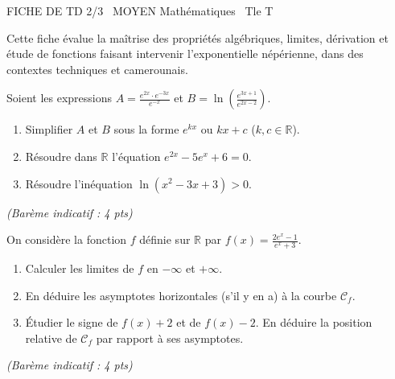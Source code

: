 \documentclass[11pt]{article}
\begin{document}
\begin{tcolorbox}[enhanced,colback=popink,colframe=popink,arc=10pt,boxrule=0pt,left=12pt,right=12pt,top=9pt,bottom=9pt]
{\color{white}\popxbold\small FICHE DE TD 2/3 \textbullet\ MOYEN \hfill Mathématiques \textbullet\ Tle T\par}
\end{tcolorbox}
\vspace{4pt}
\noindent Cette fiche évalue la maîtrise des propriétés algébriques, limites, dérivation et étude de fonctions faisant intervenir l'exponentielle népérienne, dans des contextes techniques et camerounais.

\begin{exercice}
Soient les expressions $A = \frac{e^{2x} \cdot e^{-3x}}{e^{-x}}$ et $B = \ln\left(\frac{e^{3x+1}}{e^{2x-2}}\right)$.
\begin{enumerate}
    \item Simplifier $A$ et $B$ sous la forme $e^{kx}$ ou $kx + c$ ($k, c \in \mathbb{R}$).
    \item Résoudre dans $\mathbb{R}$ l'équation $e^{2x} - 5e^{x} + 6 = 0$.
    \item Résoudre l'inéquation $\ln(x^2 - 3x + 3) > 0$.
\end{enumerate}
\hfill \textit{(Barème indicatif : 4 pts)}
\end{exercice}

\begin{exercice}
On considère la fonction $f$ définie sur $\mathbb{R}$ par $f(x) = \frac{2e^{x} - 1}{e^{x} + 3}$.
\begin{enumerate}
    \item Calculer les limites de $f$ en $-\infty$ et $+\infty$.
    \item En déduire les asymptotes horizontales (s'il y en a) à la courbe $\mathcal{C}_f$.
    \item Étudier le signe de $f(x) + 2$ et de $f(x) - 2$. En déduire la position relative de $\mathcal{C}_f$ par rapport à ses asymptotes.
\end{enumerate}
\hfill \textit{(Barème indicatif : 4 pts)}
\end{exercice}
\end{document}
